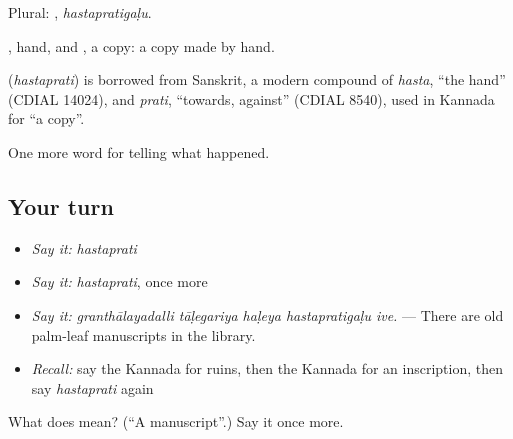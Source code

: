 Plural: , \emph{hastapratigaḷu}.

, hand, and , a copy: a copy made by hand.

\begin{cousinweb}
\textbf{} (\emph{hastaprati}) is borrowed from Sanskrit, a modern compound of \emph{hasta}, \textquotedblleft{}the hand\textquotedblright{} (CDIAL 14024), and \emph{prati}, \textquotedblleft{}towards, against\textquotedblright{} (CDIAL 8540), used in Kannada for \textquotedblleft{}a copy\textquotedblright{}.
\end{cousinweb}

\begin{grammarlens}[title={What you've built}]
One more word for telling what happened.
\end{grammarlens}

\subsection*{Your turn}
\begin{itemize}
\raggedright
  \item \emph{Say it:} \emph{hastaprati}
  \item \emph{Say it:} \emph{hastaprati}, once more
  \item \emph{Say it:} \emph{granthālayadalli tāḷegariya haḷeya hastapratigaḷu ive.} — There are old palm-leaf manuscripts in the library.
  \item \emph{Recall:} say the Kannada for ruins, then the Kannada for an inscription, then say \emph{hastaprati} again
\end{itemize}

\begin{tcolorbox}[breakable,colback=teal!4,colframe=teal!35!black,title={Before you move on}]
What does  mean? (\textquotedblleft{}A manuscript\textquotedblright{}.) Say it once more.
\end{tcolorbox}

